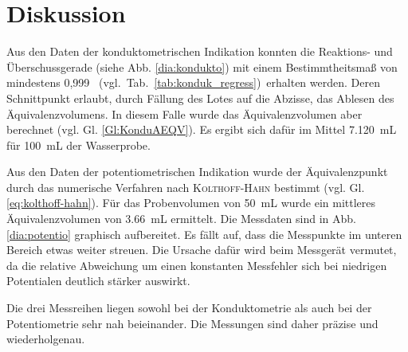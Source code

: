 \section{Diskussion}
\label{sec:diskussion}

Aus den  Daten der konduktometrischen Indikation konnten die Reaktions- und Überschussgerade (siehe Abb. \ref{dia:kondukto}) mit einem Bestimmtheitsmaß von mindestens 0,999 \mbox{ (vgl. Tab. \ref{tab:konduk_regress}) }erhalten werden. Deren Schnittpunkt erlaubt, durch Fällung des Lotes auf die Abzisse, das Ablesen des Äquivalenzvolumens. In diesem Falle wurde das Äquivalenzvolumen aber berechnet (vgl. Gl. \eqref{Gl:KonduAEQV}). Es ergibt sich dafür im Mittel \SI{7,120}{\milli\liter} für \SI{100}{\milli\liter} der Wasserprobe. 

Aus den Daten der potentiometrischen Indikation wurde der Äquivalenzpunkt durch das numerische Verfahren nach \textsc{Kolthoff-Hahn } bestimmt (vgl. Gl. \eqref{eq:kolthoff-hahn}). Für das Probenvolumen von \SI{50}{\milli\liter} wurde ein mittleres Äquivalenzvolumen von  \SI{3,66}{\milli \liter} ermittelt. Die Messdaten sind in Abb. \ref{dia:potentio} graphisch aufbereitet. Es fällt auf, dass die Messpunkte im unteren Bereich etwas weiter streuen. Die Ursache dafür wird beim Messgerät vermutet, da die relative Abweichung um einen konstanten Messfehler sich bei niedrigen Potentialen deutlich stärker auswirkt. 

Die drei Messreihen liegen sowohl bei der Konduktometrie als auch bei der Potentiometrie sehr nah beieinander. Die Messungen sind daher präzise und wiederholgenau.